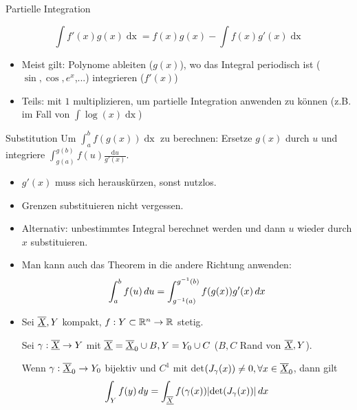 \begin{mainbox}{Partielle Integration}

	$$\int f'(x) g(x) \mathop{dx} = f(x)g(x) - \int f(x) g'(x) \mathop{dx}$$
\end{mainbox}
\begin{itemize}
	\item Meist gilt: Polynome ableiten ($g(x)$), wo das Integral periodisch ist ($\sin, \cos, e^x$,...) integrieren ($f'(x)$)
	\item Teils: mit $1$ multiplizieren, um partielle Integration anwenden zu können (z.B. im Fall von $\int \log(x) \mathop{dx}$)
\end{itemize}
\begin{mainbox}{Substitution}
	Um $\int_a^b f(g(x)) \mathop{dx}$ zu berechnen: Ersetze $g(x)$ durch $u$ und integriere $\int_{g(a)}^{g(b)} f(u) \frac{\text{d}u}{g'(x)}$.
\end{mainbox}
\begin{itemize}
	\item $g'(x)$ muss sich herauskürzen, sonst nutzlos.
	\item Grenzen substituieren nicht vergessen.
	\item Alternativ: unbestimmtes Integral berechnet werden und dann $u$ wieder durch $x$ substituieren.
	\item Man kann auch das Theorem in die andere Richtung anwenden: \[\int_a^b f(u) \mathop{du} = \int_{g^{-1}(a)}^{g^{-1}(b)}f(g(x))g'(x) \mathop{dx}\]
	\item Sei $\underline{\overline{X}}, Y$ kompakt, $f: Y \subset \mathbb{R}^n \to \mathbb{R}$ stetig.

	      Sei $\gamma: \underline{\overline{X}} \to Y$ mit $\underline{\overline{X}} = \underline{\overline{X}}_0 \cup B, Y = Y_0 \cup C$ ($B, C$ Rand von $\underline{\overline{X}}, Y$).

	      Wenn $\gamma: \underline{\overline{X}}_0 \to Y_0$ bijektiv und $C^1$ mit det$(J_\gamma(x)) \neq 0, \forall x \in \underline{\overline{X}}_0$, dann gilt
	      \[\int_Y f(y)\mathop{dy} = \int_{\underline{\overline{X}}} f(\gamma(x))|\text{det}(J_\gamma(x))|\mathop{dx}\]
\end{itemize}

